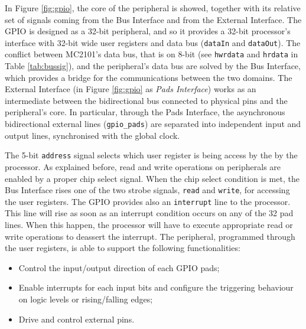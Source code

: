 In Figure \ref{fig:gpio}, the core of the peripheral is showed, together with its relative set of signals coming from the Bus Interface and from the External Interface.
The GPIO is designed as a 32-bit peripheral, and so it provides a 32-bit processor's interface with 32-bit wide user registers and data bus (\texttt{dataIn} and \texttt{dataOut}). The conflict between MC2101's data bus, that is on 8-bit (see \texttt{hwrdata} and \texttt{hrdata} in Table \ref{tab:bussig}), and the peripheral's data bus are solved by the Bus Interface, which provides a bridge for the communications between the two domains. The External Interface (in Figure \ref{fig:gpio} as \emph{Pads Interface}) works as an intermediate between the bidirectional bus connected to physical pins and the peripheral's core. In particular, through the Pads Interface, the asynchronous bidirectional external lines (\texttt{gpio\_pads}) are separated into independent input and output lines, synchronised with the global clock.

The 5-bit \texttt{address} signal selects which user register is being access by the by the processor. As explained before, read and write operations on peripherals are enabled by a proper chip select signal. When the chip select condition is met, the Bus Interface rises one of the two strobe signals, \texttt{read} and \texttt{write}, for accessing the user registers. The GPIO provides also an \texttt{interrupt} line to the processor. This line will rise as soon as an interrupt condition occurs on any of the 32 pad lines. When this happen, the processor will have to execute appropriate read or write operations to deassert the interrupt. The peripheral, programmed through the user registers, is able to support the following functionalities:

\begin{itemize}
\item Control the input/output direction of each GPIO pads;
\item Enable interrupts for each input bits and configure the triggering behaviour on logic levels or rising/falling edges;
\item Drive and control external pins.
\end{itemize}

